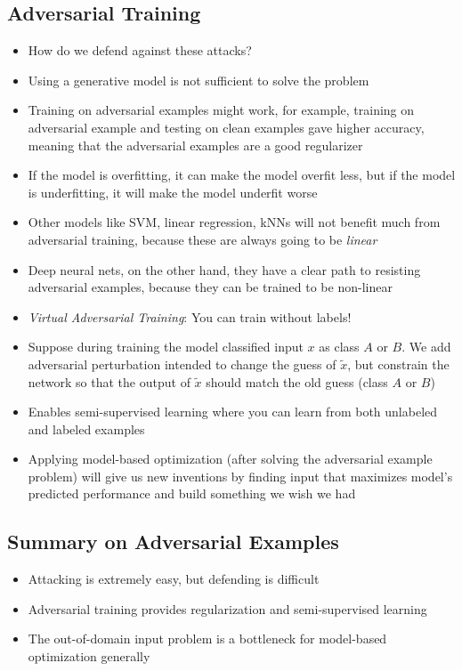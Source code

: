\subsection{Adversarial Training}
\begin{itemize}
	\item How do we defend against these attacks?
	\item Using a generative model is not sufficient to solve the problem
	\item Training on adversarial examples might work, for example, training on adversarial example and testing on clean examples gave higher accuracy, meaning that the adversarial examples are a good regularizer
	\item If the model is overfitting, it can make the model overfit less, but if the model is underfitting, it will make the model underfit worse
	\item Other models like SVM, linear regression, kNNs will not benefit much from adversarial training, because these are always going to be \textit{linear}
	\item Deep neural nets, on the other hand, they have a clear path to resisting adversarial examples, because they can be trained to be non-linear
	\item \textit{Virtual Adversarial Training}: You can train without labels!
	\item Suppose during training the model classified input $x$ as class $A$ or $B$. We add adversarial perturbation intended to change the guess of $\widetilde{x}$, but constrain the network so that the output of $\widetilde{x}$ should match the old guess (class $A$ or $B$)
	\item Enables semi-supervised learning where you can learn from both unlabeled and labeled examples
	\item Applying model-based optimization (after solving the adversarial example problem) will give us new inventions by finding input that maximizes model's predicted performance and build something we wish we had
\end{itemize}

\subsection{Summary on Adversarial Examples}
\begin{itemize}
	\item Attacking is extremely easy, but defending is difficult
	\item Adversarial training provides regularization and semi-supervised learning
	\item The out-of-domain input problem is a bottleneck for model-based optimization generally
\end{itemize}
